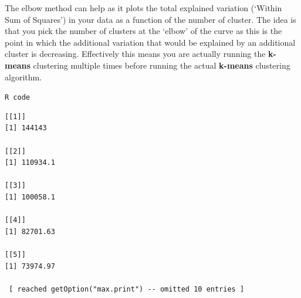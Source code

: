 \documentclass[
  letterpaper,
  DIV=11,
  numbers=noendperiod]{scrreprt}
\newenvironment{Shaded}{\begin{snugshade}}{\end{snugshade}}
\newcommand{\AttributeTok}[1]{\textcolor[rgb]{0.40,0.45,0.13}{#1}}
\newcommand{\CommentTok}[1]{\textcolor[rgb]{0.37,0.37,0.37}{#1}}
\newcommand{\ControlFlowTok}[1]{\textcolor[rgb]{0.00,0.23,0.31}{#1}}
\newcommand{\DecValTok}[1]{\textcolor[rgb]{0.68,0.00,0.00}{#1}}
\newcommand{\FunctionTok}[1]{\textcolor[rgb]{0.28,0.35,0.67}{#1}}
\newcommand{\NormalTok}[1]{\textcolor[rgb]{0.00,0.23,0.31}{#1}}
\newcommand{\OtherTok}[1]{\textcolor[rgb]{0.00,0.23,0.31}{#1}}
\newcommand{\SpecialCharTok}[1]{\textcolor[rgb]{0.37,0.37,0.37}{#1}}
\begin{document}
The elbow method can help as it plots the total explained variation
(`Within Sum of Squares') in your data as a function of the number of
cluster. The idea is that you pick the number of clusters at the `elbow'
of the curve as this is the point in which the additional variation that
would be explained by an additional cluster is decreasing. Effectively
this means you are actually running the \textbf{k-means} clustering
multiple times before running the actual \textbf{k-means} clustering
algorithm.

\begin{codelisting}

\caption{\texttt{R code}}

\begin{Shaded}
\end{Shaded}

\end{codelisting}

\begin{verbatim}
[[1]]
[1] 144143

[[2]]
[1] 110934.1

[[3]]
[1] 100058.1

[[4]]
[1] 82701.63

[[5]]
[1] 73974.97

 [ reached getOption("max.print") -- omitted 10 entries ]
\end{verbatim}
\end{document}
